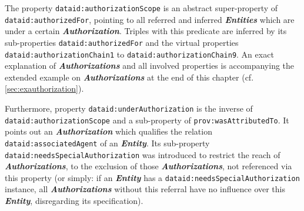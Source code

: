 \documentclass[a4paper,english,twoside,BCOR1.5cm,headsepline,DIV12,appendixprefix,final,12pt]{scrbook}
\newcommand{\prop}[1]{{{\texttt{#1}}}}
\newcommand{\important}[1]{\textbf{\textit{#1}}}
\begin{document}
The property \prop{dataid:authorizationScope} is an abstract super-property of \prop{dataid:authorizedFor}, pointing to all referred and inferred \important{Entities} which are under a certain \important{Authorization}. Triples with this predicate are inferred by its sub-properties \prop{dataid:authorizedFor} and the virtual properties \prop{dataid:authorizationChain1} to \prop{dataid:authorizationChain9}. An exact explanation of \important{Authorizations} and all involved properties is accompanying the extended example on \important{Authorizations} at the end of this chapter (cf. \cref{sec:exauthorization}).

Furthermore, property \prop{dataid:underAuthorization} is the inverse of \prop{dataid:authorizationScope} and a sub-property of \prop{prov:wasAttributedTo}. It points out an \important{Authorization} which qualifies the relation \prop{dataid:associatedAgent} of an \important{Entity}. Its sub-property \prop{dataid:needsSpecialAuthorization} was introduced to restrict the reach of \important{Authorizations}, to the exclusion of those \important{Authorizations}, not referenced via this property (or simply: if an \important{Entity} has a \prop{dataid:needsSpecialAuthorization} instance, all \important{Authorizations} without this referral have no influence over this \important{Entity}, disregarding its specification).
\end{document}
